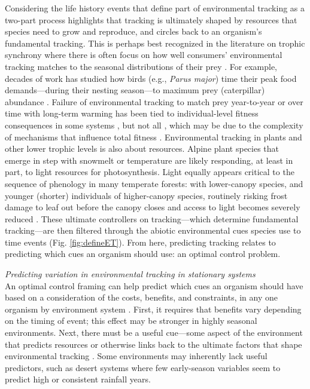 \documentclass[11pt,letterpaper]{article}
\begin{document}
Considering the life history events that define part of environmental tracking as a two-part process highlights that tracking is ultimately shaped by resources that species need to grow and reproduce, and circles back to an organism's fundamental tracking. This is perhaps best recognized in the literature on trophic synchrony where there is often focus on how well consumers' environmental tracking matches to the seasonal distributions of their prey \citep{deacy2018,kharouba2018}. For example, decades of work has studied how birds (e.g., \emph{Parus major}) time their peak food demands---during their nesting season---to maximum prey (caterpillar) abundance \citep[e.g.,][]{charm2008}. Failure of environmental tracking to match prey year-to-year or over time with long-term warming has been tied to individual-level fitness consequences in some systems \citep{charm2008}, but not all \citep{visser2006}, which may be due to the complexity of mechanisms that influence total fitness \citep{Singer:2010eb,Johansson2012}. Environmental tracking in plants and other lower trophic levels is also about resources. Alpine plant species that emerge in step with snowmelt or temperature are likely responding, at least in part, to light resources for photosynthesis. Light equally appears critical to the sequence of phenology in many temperate forests: with lower-canopy species, and younger (shorter) individuals of higher-canopy species, routinely risking frost damage to leaf out before the canopy closes and access to light becomes severely reduced \citep{Vitasse2013,heberling2019}. These ultimate controllers on tracking---which determine fundamental tracking---are then filtered through the abiotic environmental cues species use to time events (Fig. \ref{fig:defineET}). From here, predicting tracking relates to predicting which cues an organism should use: an optimal control problem.%

\emph{Predicting variation in environmental tracking in stationary systems}\\
An optimal control framing can help predict which cues an organism should have based on a consideration of the costs, benefits, and constraints, in any one organism by environment system \citep{donahue2015}. First, it requires that benefits vary depending on the timing of event; this effect may be stronger in highly seasonal environments. Next, there must be a useful cue---some aspect of the environment that predicts resources or otherwise links back to the ultimate factors that shape environmental tracking \citep{gremer2016}. Some environments may inherently lack useful predictors, such as desert systems where few early-season variables seem to predict high or consistent rainfall years. 
\end{document}
